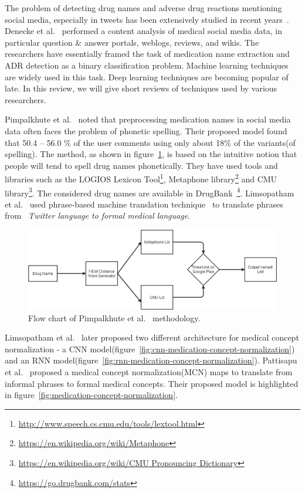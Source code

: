The problem of detecting drug names and adverse drug reactions mentioning social media, especially in tweets has been extensively studied in recent years~\cite{weissenbacher2018overview}. Denecke et al.~\cite{DENECKE20091870} performed a content analysis of medical social media data, in particular question \& answer portals, weblogs, reviews, and wikis. The researchers have essentially framed the task of medication name extraction and ADR detection as a binary classification problem. Machine learning techniques are widely used in this task. Deep learning techniques are becoming popular of late. In this review, we will give short reviews of techniques used by various researchers.

Pimpalkhute et al.~\cite{pimpalkhute2014phonetic} noted that preprocessing medication names in social media data often faces the problem of phonetic spelling. Their proposed model found that 50.4 – 56.0 \% of the user comments using only about 18\% of the variants(of spelling). The method, as shown in figure~\ref{fig:model-pimpalkhute}, is based on the intuitive notion that people will tend to spell drug names phonetically. They have used tools and libraries such as the LOGIOS Lexicon Tool\footnote{\url{http://www.speech.cs.cmu.edu/tools/lextool.html}}, Metaphone library\footnote{\url{https://en.wikipedia.org/wiki/Metaphone}} and CMU library\footnote{\url{https://en.wikipedia.org/wiki/CMU Pronouncing Dictionary}}. The considered drug names are available in DrugBank~\footnote{\url{https://go.drugbank.com/stats}}. Limsopatham et al.~\cite{limsopatham2015adapting} used phrase-based machine translation technique~\cite{koehn2003statistical} to translate phrases from ~\textit{Twitter language to formal medical language}.

\begin{figure}[h]
	\centering
	\includegraphics[width=0.99\linewidth]{Figures/m.png}
	\caption{Flow chart of Pimpalkhute et al.~\cite{pimpalkhute2014phonetic} methodology.}
	\label{fig:model-pimpalkhute}
\end{figure}

Limsopatham et al.~\cite{limsopatham2016normalising} later proposed two different architecture for medical concept normalization - a CNN model(figure~\ref{fig:cnn-medication-concept-normalization}) and an RNN model(figure~\ref{fig:rnn-medication-concept-normalization}). Pattisapu et al.~\cite{PATTISAPU2020103522} proposed a medical concept normalization(MCN) maps to translate from informal phrases to formal medical concepts. Their proposed model is highlighted in figure~\ref{fig:medication-concept-normalization}.

